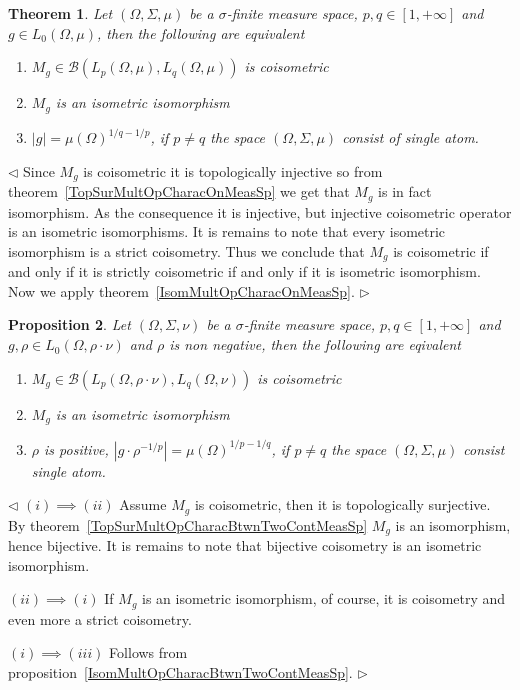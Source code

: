 \documentclass[12pt]{article}
\newtheorem{theorem}{Theorem}[subsection]
\newtheorem{proposition}[theorem]{Proposition}
\newenvironment{proof}{\par $\triangleleft$}{$\triangleright$}
\begin{document}
\begin{theorem}\label{CoisomMultOpCharacOnMeasSp}
    Let $(\Omega,\Sigma,\mu)$ be a $\sigma$-finite measure space,
    $p,q\in[1,+\infty]$ and $g\in L_0(\Omega,\mu)$, then the
    following are equivalent
    \begin{enumerate}[label = (\roman*)]
        \item $M_g\in\mathcal{B}(L_p(\Omega,\mu),L_q(\Omega,\mu))$
              is coisometric

        \item $M_g$ is an isometric isomorphism

        \item $|g|={\mu(\Omega)}^{1/q-1/p}$, if $p\neq q$ the space
              $(\Omega,\Sigma,\mu)$ consist of single atom.
    \end{enumerate}
\end{theorem}
\begin{proof} Since $M_g$ is coisometric it is topologically injective so from
    theorem~\ref{TopSurMultOpCharacOnMeasSp} we get that $M_g$ is in fact
    isomorphism. As the consequence it is injective, but injective coisometric
    operator is an isometric isomorphisms. It is remains to note that every
    isometric isomorphism is a strict coisometry. Thus we conclude that $M_g$
    is coisometric if and only if it is strictly coisometric if and only if it
    is isometric isomorphism. Now we apply
    theorem~\ref{IsomMultOpCharacOnMeasSp}.
\end{proof}

\begin{proposition}\label{CoisomMultOpCharacBtwnTwoContMeasSp}
    Let $(\Omega,\Sigma,\nu)$ be a $\sigma$-finite measure space,
    $p,q\in[1,+\infty]$ and $g,\rho\in L_0(\Omega,\rho\cdot\nu)$ and $\rho$ is
    non negative, then the following are eqivalent
    \begin{enumerate}[label = (\roman*)]
        \item $M_g\in\mathcal{B}(L_p(\Omega,\rho\cdot\nu),L_q(\Omega,\nu))$
              is coisometric

        \item $M_g$ is an isometric isomorphism

        \item $\rho$ is positive,
              $|g\cdot \rho^{-1/p}|={\mu(\Omega)}^{1/p-1/q}$, if $p\neq q$ the space
              $(\Omega,\Sigma,\mu)$ consist single atom.
    \end{enumerate}
\end{proposition}
\begin{proof} $(i)\implies (ii)$ Assume $M_g$ is coisometric, then it is
    topologically surjective. By
    theorem~\ref{TopSurMultOpCharacBtwnTwoContMeasSp} $M_g$ is an isomorphism,
    hence bijective. It is remains to note that bijective coisometry is an
    isometric isomorphism.

    $(ii)\implies (i)$ If $M_g$ is an isometric isomorphism, of course, it is
    coisometry and even more a strict coisometry.

    $(i)\implies (iii)$ Follows from
    proposition~\ref{IsomMultOpCharacBtwnTwoContMeasSp}.
\end{proof}
\end{document}
